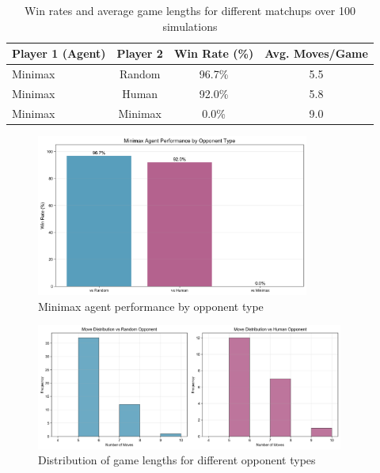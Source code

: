 \documentclass[12pt]{article}
\begin{document}
\begin{table}[H]
\centering
\begin{tabular}{lccc}
\toprule
Player 1 (Agent) & Player 2 & Win Rate (\%) & Avg. Moves/Game \\
\midrule
Minimax  & Random         & 96.7\%  & 5.5 \\
Minimax  & Human  & 92.0\%  & 5.8 \\
Minimax  & Minimax        & 0.0\%  & 9.0 \\
\bottomrule
\end{tabular}
\caption{Win rates and average game lengths for different matchups over 100 simulations}
\end{table}

\begin{figure}[H]
\centering
\includegraphics[width=0.8\textwidth]{win_rates.png}
\caption{Minimax agent performance by opponent type}
\label{fig:win_rates}
\end{figure}

\begin{figure}[H]
\centering
\includegraphics[width=0.9\textwidth]{move_distribution.png}
\caption{Distribution of game lengths for different opponent types}
\label{fig:move_distribution}
\end{figure}
\end{document}
